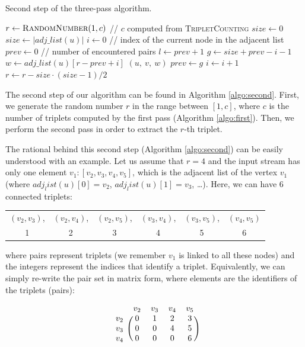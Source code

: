 \documentclass[12pt,a4paper]{article}
\begin{document}
\begin{algorithm}
\caption{Second step of the three-pass algorithm.}\label{algo:second}
\begin{algorithmic}[1]
\State $r \gets \textsc{RandomNumber}(1, c)$  // $c$ computed from \textsc{TripletCounting}
\State $size \gets 0$
\State $size \gets |adj\_list(u)|$
\State $i \gets 0$ // index of the current node in the adjacent list
\State $prev \gets 0$ // number of encountered pairs
	\State $l \gets prev + 1$
    \State $g \gets size + prev - i - 1$
    	\State $w \gets adj\_list(u)[r - prev + i]$
    	\State \Return $(u,\ v,\ w)$
    \EndIf
    \State $prev \gets g$
    \State $i \gets i + 1$
\EndFor
\State $r \gets r - size \cdot (size - 1) / 2$
\EndFor
\EndFunction
\end{algorithmic}
\end{algorithm}
\newpage
The second step of our algorithm can be found in Algorithm \ref{algo:second}. First, we generate the random number $r$ in the range between $[1, c]$, where $c$ is the number of triplets computed by the first pass (Algorithm \ref{algo:first}). Then, we perform the second pass in order to extract the $r$-th triplet.

The rational behind this second step (Algorithm \ref{algo:second}) can be easily understood with an example. Let us assume that $r = 4$ and the input stream has only one element $v_1: [v_2, v_3, v_4, v_5]$, which is the adjacent list of the vertex $v_1$ (where $adj_list(u)[0] = v_2$, $adj_list(u)[1] = v_3$, \dots). Here, we can have 6 connected triplets:

\begin{table}[h]
\centering
\begin{tabular}{cccccc}
$(v_2, v_3)$, & $(v_2, v_4)$, & $(v_2, v_5)$, & $(v_3, v_4)$, & $(v_3, v_5)$, & $(v_4, v_5)$\\
 1 & 2 & 3& 4 & 5 & 6
\end{tabular}
\end{table}

where pairs represent triplets (we remember $v_1$ is linked to all these nodes) and the integers represent the indices that identify a triplet. Equivalently, 
we can simply re-write the pair set in matrix form, where elements are the identifiers of the triplets (pairs):

 \[
\begin{blockarray}{cccccc}
& v_2 & v_3 & v_4 & v_5 \\
\begin{block}{c(ccccc)}
  v_2 & 0 & 1 & 2 & 3   \\
  v_3 & 0 & 0 & 4 & 5   \\
  v_4 & 0 & 0 & 0 & 6  \\
\end{block}
\end{blockarray}
 \]
 
\end{document}

